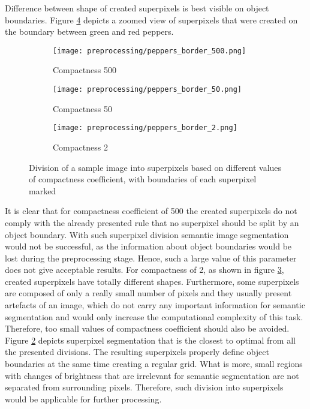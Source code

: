 Difference between shape of created superpixels is best visible on object boundaries. Figure \ref{fig:peppers_boundaries_zoom} depicts a zoomed view of superpixels that were created on the boundary between green and red peppers.
\begin{figure}[ht]
 \centering
  \begin{subfigure}[h]{0.32\textwidth}
    \texttt{[image: preprocessing/peppers\_border\_500.png]}
    \caption{Compactness 500}
    \label{fig:peppers_boundaries_zoom_500}
  \end{subfigure}
  \begin{subfigure}[h]{0.32\textwidth}
    \texttt{[image: preprocessing/peppers\_border\_50.png]}
    \caption{Compactness 50}
    \label{fig:peppers_boundaries_zoom_50}
  \end{subfigure}
    \begin{subfigure}[h]{0.32\textwidth}
    \texttt{[image: preprocessing/peppers\_border\_2.png]}
    \caption{Compactness 2}
    \label{fig:peppers_boundaries_zoom_2}
  \end{subfigure}
     \caption{Division of a sample image into superpixels based on different values of compactness coefficient, with boundaries of each superpixel marked}%
    \label{fig:peppers_boundaries_zoom} 
\end{figure}
It is clear that for compactness coefficient of 500 the created superpixels do not comply with the already presented rule that no superpixel should be split by an object boundary. With such superpixel division semantic image segmentation would not be successful, as the information about object boundaries would be lost during the preprocessing stage. Hence, such a large value of this parameter does not give acceptable results. For compactness of 2, as shown in figure \ref{fig:peppers_boundaries_zoom_2}, created superpixels have totally different shapes. Furthermore, some superpixels are composed of only a really small number of pixels and they usually present artefacts of an image, which do not carry any important information for semantic segmentation and would only increase the computational complexity of this task. Therefore, too small values of compactness coefficient should also be avoided. Figure \ref{fig:peppers_boundaries_zoom_50} depicts superpixel segmentation that is the closest to optimal from all the presented divisions. The resulting superpixels properly define object boundaries at the same time creating a regular grid. What is more, small regions with changes of brightness that are irrelevant for semantic segmentation are not separated from surrounding pixels. Therefore, such division into superpixels would be applicable for further processing.

